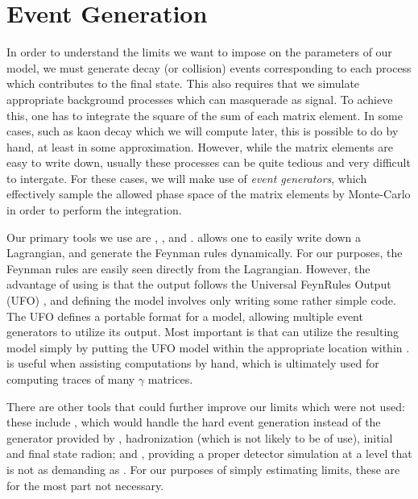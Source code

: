 \section{Event Generation}

In order to understand the limits we want to impose on the parameters of our model, we must generate decay (or collision) events corresponding to each process which contributes to the final state.
This also requires that we simulate appropriate background processes which can masquerade as signal.
To achieve this, one has to integrate the square of the sum of each matrix element.
In some cases, such as kaon decay which we will compute later, this is possible to do by hand, at least in some approximation.
However, while the matrix elements are easy to write down, usually these processes can be quite tedious and very difficult to intergate.
For these cases, we will make use of \emph{event generators}, which effectively sample the allowed phase space of the matrix elements by Monte-Carlo in order to perform the integration.

Our primary tools we use are \feynrules \cite{Alloul:2013bka}, \feyncalc \cite{Mertig:1990an}, and \mgamcnlo \cite{Alwall:2011uj,Alwall:2014hca}.
\feynrules allows one to easily write down a Lagrangian, and generate the Feynman rules dynamically.
For our purposes, the Feynman rules are easily seen directly from the Lagrangian.
However, the advantage of using \feynrules is that the output follows the Universal FeynRules Output (UFO) \cite{Degrande:2011ua}, and defining the model involves only writing some rather simple \mathematica code.
The UFO defines a portable format for a model, allowing multiple event generators to utilize its output.
Most important is that \madgraph can utilize the resulting model simply by putting the UFO model within the appropriate location within \madgraph.
\feyncalc is useful when assisting computations by hand, which is ultimately used for computing traces of many $\gamma$ matrices.

There are other tools that could further improve our limits which were not used: these include \pythia \cite{Sjostrand:2007gs}, which would handle the hard event generation instead of the generator provided by \madgraph, hadronization (which is not likely to be of use), initial and final state radion; and \delphes \cite{Selvaggi:2014mya}, providing a proper detector simulation at a level that is not as demanding as \geant \cite{Agostinelli:2002hh}. For our purposes of simply estimating limits, these are for the most part not necessary.

